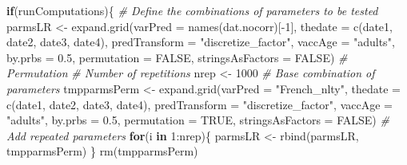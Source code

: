 \documentclass[
]{article}
\newenvironment{Shaded}{\begin{snugshade}}{\end{snugshade}}
\newcommand{\AttributeTok}[1]{\textcolor[rgb]{0.77,0.63,0.00}{#1}}
\newcommand{\CommentTok}[1]{\textcolor[rgb]{0.56,0.35,0.01}{\textit{#1}}}
\newcommand{\ConstantTok}[1]{\textcolor[rgb]{0.00,0.00,0.00}{#1}}
\newcommand{\ControlFlowTok}[1]{\textcolor[rgb]{0.13,0.29,0.53}{\textbf{#1}}}
\newcommand{\DecValTok}[1]{\textcolor[rgb]{0.00,0.00,0.81}{#1}}
\newcommand{\FloatTok}[1]{\textcolor[rgb]{0.00,0.00,0.81}{#1}}
\newcommand{\FunctionTok}[1]{\textcolor[rgb]{0.00,0.00,0.00}{#1}}
\newcommand{\NormalTok}[1]{#1}
\newcommand{\OtherTok}[1]{\textcolor[rgb]{0.56,0.35,0.01}{#1}}
\newcommand{\SpecialCharTok}[1]{\textcolor[rgb]{0.00,0.00,0.00}{#1}}
\newcommand{\StringTok}[1]{\textcolor[rgb]{0.31,0.60,0.02}{#1}}
\begin{document}
\begin{Shaded}
\begin{Highlighting}[]
\ControlFlowTok{if}\NormalTok{(runComputations)\{}
  \CommentTok{\# Define the combinations of parameters to be tested}
\NormalTok{  parmsLR }\OtherTok{\textless{}{-}} \FunctionTok{expand.grid}\NormalTok{(}\AttributeTok{varPred =} \FunctionTok{names}\NormalTok{(dat.nocorr)[}\SpecialCharTok{{-}}\DecValTok{1}\NormalTok{], }
                         \AttributeTok{thedate =} \FunctionTok{c}\NormalTok{(date1, date2, date3, date4), }
                         \AttributeTok{predTransform =} \StringTok{"discretize\_factor"}\NormalTok{, }
                         \AttributeTok{vaccAge =} \StringTok{"adults"}\NormalTok{, }
                         \AttributeTok{by.prbs =} \FloatTok{0.5}\NormalTok{, }
                         \AttributeTok{permutation =} \ConstantTok{FALSE}\NormalTok{,}
                         \AttributeTok{stringsAsFactors =} \ConstantTok{FALSE}\NormalTok{)}
  \CommentTok{\# Permutation }
  \CommentTok{\# Number of repetitions}
\NormalTok{  nrep }\OtherTok{\textless{}{-}} \DecValTok{1000}
  \CommentTok{\# Base combination of parameters}
\NormalTok{  tmpparmsPerm }\OtherTok{\textless{}{-}} \FunctionTok{expand.grid}\NormalTok{(}\AttributeTok{varPred =} \StringTok{"French\_nlty"}\NormalTok{, }
                              \AttributeTok{thedate =} \FunctionTok{c}\NormalTok{(date1, date2, date3, date4), }
                              \AttributeTok{predTransform =} \StringTok{"discretize\_factor"}\NormalTok{, }
                              \AttributeTok{vaccAge =} \StringTok{"adults"}\NormalTok{, }
                              \AttributeTok{by.prbs =} \FloatTok{0.5}\NormalTok{, }
                              \AttributeTok{permutation =} \ConstantTok{TRUE}\NormalTok{,}
                              \AttributeTok{stringsAsFactors =} \ConstantTok{FALSE}\NormalTok{)}
  \CommentTok{\# Add repeated parameters}
  \ControlFlowTok{for}\NormalTok{(i }\ControlFlowTok{in} \DecValTok{1}\SpecialCharTok{:}\NormalTok{nrep)\{}
\NormalTok{    parmsLR }\OtherTok{\textless{}{-}} \FunctionTok{rbind}\NormalTok{(parmsLR, tmpparmsPerm)}
\NormalTok{  \}}
  \FunctionTok{rm}\NormalTok{(tmpparmsPerm)}
  

\end{Highlighting}
\end{Shaded}
\end{document}
